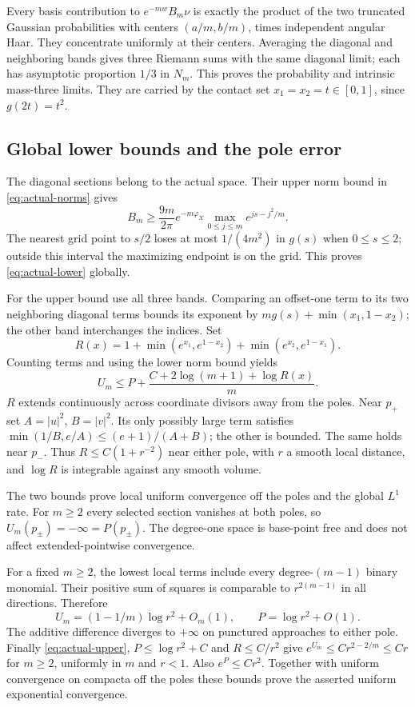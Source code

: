 \documentclass[11pt]{article}
\begin{document}
Every basis contribution to $e^{-mw}B_m\nu$ is exactly the
product of the two truncated Gaussian probabilities with centers
$(a/m,b/m)$, times independent angular Haar. They concentrate
uniformly at their centers. Averaging the diagonal and neighboring
bands gives three Riemann sums with the same diagonal limit;
each has asymptotic proportion $1/3$ in $N_m$. This proves the
probability and intrinsic mass-three limits. They are carried
by the contact set $x_1=x_2=t\in[0,1]$, since $g(2t)=t^2$.

\subsection{Global lower bounds and the pole error}
The diagonal sections belong to the actual space. Their upper
norm bound in \eqref{eq:actual-norms} gives
\[
 B_m\geq\frac{9m}{2\pi}e^{-m\varphi_X}
                    \max_{0\leq j\leq m}e^{js-j^2/m}.
\]
The nearest grid point to $s/2$ loses at most $1/(4m^2)$ in
$g(s)$ when $0\leq s\leq2$; outside this interval the
maximizing endpoint is on the grid. This proves
\eqref{eq:actual-lower} globally.

For the upper bound use all three bands. Comparing an offset-one
term to its two neighboring diagonal terms bounds its exponent
by $mg(s)+\min(x_1,1-x_2)$; the other band interchanges the
indices. Set
\[
 R(x)=1+\min(e^{x_1},e^{1-x_2})
             +\min(e^{x_2},e^{1-x_1}).
\]
Counting terms and using the lower norm bound yields
\begin{equation}\label{eq:actual-upper}
 U_m\leq P+\frac{C+2\log(m+1)+\log R(x)}m.
\end{equation}
$R$ extends continuously across coordinate divisors away from
the poles. Near $p_+$ set $A=|u|^2$, $B=|v|^2$.
Its only possibly large term satisfies
$\min(1/B,e/A)\leq(e+1)/(A+B)$; the other is bounded.
The same holds near $p_-$. Thus $R\leq C(1+r^{-2})$ near
either pole, with $r$ a smooth local distance, and $\log R$
is integrable against any smooth volume.

The two bounds prove local uniform convergence off the poles
and the global $L^1$ rate.
For $m\geq2$ every selected section vanishes at both poles,
so $U_m(p_\pm)=-\infty=P(p_\pm)$. The degree-one space is
base-point free and does not affect extended-pointwise convergence.

For a fixed $m\geq2$, the lowest local terms include every
degree-$(m-1)$ binary monomial. Their positive sum of squares
is comparable to $r^{2(m-1)}$ in all directions. Therefore
\[
 U_m=(1-1/m)\log r^2+O_m(1),\qquad
 P=\log r^2+O(1).
\]
The additive difference diverges to $+\infty$ on punctured
approaches to either pole. Finally \eqref{eq:actual-upper},
$P\leq\log r^2+C$ and $R\leq C/r^2$ give
$e^{U_m}\leq C r^{2-2/m}\leq Cr$ for $m\geq2$, uniformly
in $m$ and $r<1$. Also $e^P\leq Cr^2$. Together with uniform
convergence on compacta off the poles these bounds prove the
asserted uniform exponential convergence.
\end{document}

